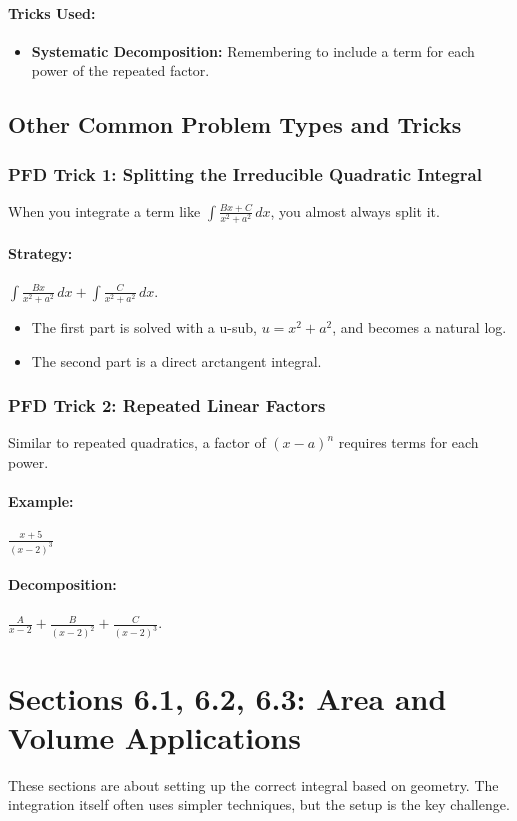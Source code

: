 \documentclass{article}
\begin{document}
\paragraph{Tricks Used:}
\begin{itemize}
    \item \textbf{Systematic Decomposition:} Remembering to include a term for each power of the repeated factor.
\end{itemize}

\subsection{Other Common Problem Types and Tricks}
\subsubsection{PFD Trick 1: Splitting the Irreducible Quadratic Integral}
When you integrate a term like $\int \frac{Bx+C}{x^2+a^2} \,dx$, you almost always split it.
\paragraph{Strategy:} $\int \frac{Bx}{x^2+a^2} \,dx + \int \frac{C}{x^2+a^2} \,dx$.
\begin{itemize}
    \item The first part is solved with a u-sub, $u=x^2+a^2$, and becomes a natural log.
    \item The second part is a direct arctangent integral.
\end{itemize}

\subsubsection{PFD Trick 2: Repeated Linear Factors}
Similar to repeated quadratics, a factor of $(x-a)^n$ requires terms for each power.
\paragraph{Example:} $\frac{x+5}{(x-2)^3}$
\paragraph{Decomposition:} $\frac{A}{x-2} + \frac{B}{(x-2)^2} + \frac{C}{(x-2)^3}$.

\section{Sections 6.1, 6.2, 6.3: Area and Volume Applications}
These sections are about setting up the correct integral based on geometry. The integration itself often uses simpler techniques, but the setup is the key challenge.
\end{document}
